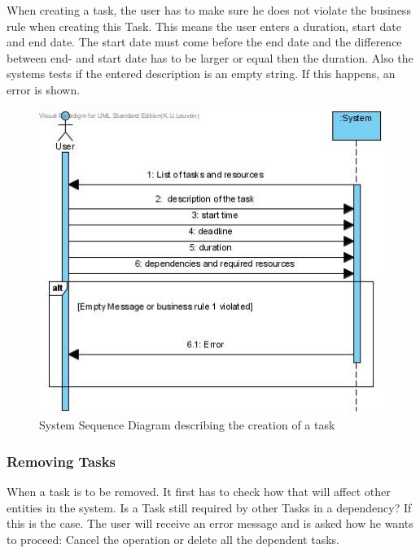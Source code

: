				When creating a task, the user has to make sure he does not violate the business rule when creating this Task. This means the user enters a duration, start date and end date. The start date must come before the end date and the difference between end- and start date has to be larger or equal then the duration. Also the systems tests if the entered description is an empty string. If this happens, an error is shown.\\
				\begin{figure}[H]
					\begin{center}
						\includegraphics[scale=0.5]{images/ssd_create_task.jpg}
					\end{center}
					\caption{System Sequence Diagram describing the creation of a task}
				\end{figure}
			\subsubsection{Removing Tasks}
			When a task is to be removed. It first has to check how that will affect other entities in the system. Is a Task still required by other Tasks in a dependency?
			If this is the case. The user will receive an error message and is asked how he wants to proceed: Cancel the operation or delete all the dependent tasks.
			
